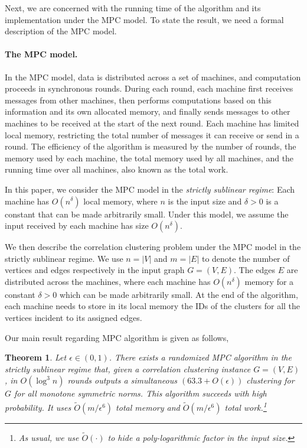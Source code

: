 \documentclass[11pt]{article}
\newtheorem{theorem}{Theorem}[section]
\begin{document}
\begin{CJK*}{UTF8}{gbsn}
Next, we are concerned with the running time of the algorithm and its implementation under the MPC model. To state the result, we need a formal description of the MPC model. 

\paragraph{The MPC model.} In the MPC model, data is distributed across a set of machines, and computation proceeds in synchronous rounds. During each round, each machine first receives messages from other machines, then performs computations based on this information and its own allocated memory, and finally sends messages to other machines to be received at the start of the next round. Each machine has limited local memory, restricting the total number of messages it can receive or send in a round. The efficiency of the algorithm is measured by the number of rounds, the memory used by each machine, the total memory used by all machines, and the running time over all machines, also known as the total work.

In this paper, we consider the MPC model in the \emph{strictly sublinear regime}: Each machine has $O(n^\delta)$ local memory, where $n$ is the input size and $\delta > 0$ is a constant that can be made arbitrarily small. Under this model, we assume the input received by each machine has size $O(n^\delta)$. 


We then describe the correlation clustering problem under the MPC model in the strictly sublinear regime. We use $n = |V|$ and $m = |E|$ to denote the number of vertices and edges respectively in the input graph $G = (V, E)$. The edges $E$ are distributed across the machines, where each machine has $O(n^\delta)$ memory for a constant $\delta > 0$ which can be made arbitrarily small. At the end of the algorithm, each machine needs to store in its local memory the IDs of the clusters for all the vertices incident to its assigned edges.

Our main result regarding MPC algorithm is given as follows,



\begin{theorem}
\label{thm:mainthmlp}
    Let $\epsilon \in (0, 1)$. 
There exists a randomized MPC algorithm in the strictly sublinear regime that, given a correlation clustering instance $G = (V, E)$, in $O(\log^3 n)$ rounds outputs a simultaneous $(63.3 + O(\epsilon))$ clustering for $G$ for all monotone symmetric norms. This algorithm succeeds with high probability. It uses $\tilde{O}(m / \epsilon^6)$ total memory and $\tilde{O}(m / \epsilon^6)$ total work.\footnote{As usual, we use $\tilde O(\cdot)$ to hide a poly-logarithmic factor in the input size.}
\end{theorem}




\end{CJK*}
\end{document}
